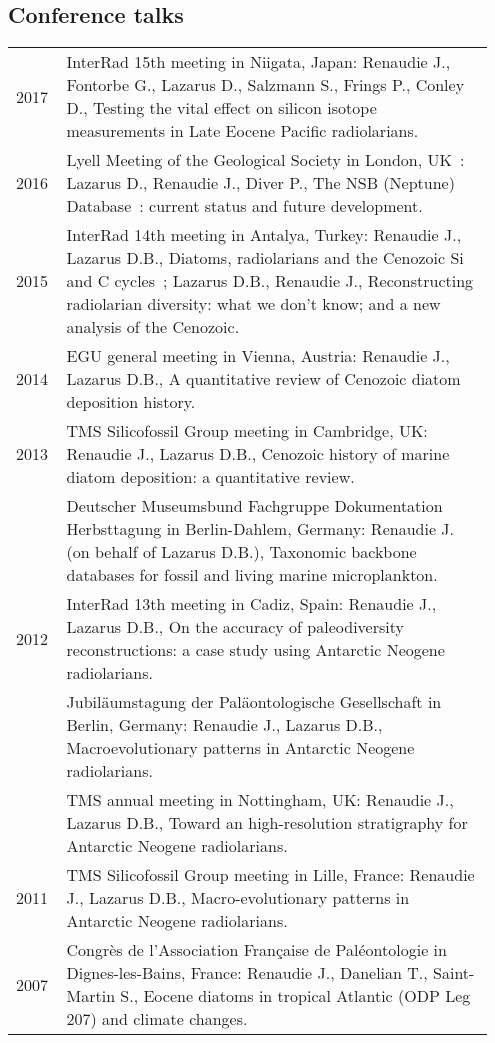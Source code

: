 \documentclass[11pt, a4paper]{article}
\begin{document}
\subsection{Conference talks}
\begin{longtable}{p{0.1\linewidth} P{0.85\linewidth}}
2017 & InterRad 15th meeting in Niigata, Japan: Renaudie J., Fontorbe G., Lazarus D., Salzmann S., Frings P., Conley D., Testing the vital effect on silicon isotope measurements in Late Eocene Pacific radiolarians.\\
2016 & Lyell Meeting of the Geological Society in London, UK : Lazarus D., Renaudie J., Diver P., The NSB (Neptune) Database : current status and future development.\\
2015 & InterRad 14th meeting in Antalya, Turkey: Renaudie J., Lazarus D.B., Diatoms, radiolarians and the Cenozoic Si and C cycles ; Lazarus D.B., Renaudie J., Reconstructing radiolarian diversity: what we don't know; and a new analysis of the Cenozoic.\\
2014 & EGU general meeting in Vienna, Austria: Renaudie J., Lazarus D.B., A quantitative review of Cenozoic diatom deposition history.\\
2013 & TMS Silicofossil Group meeting in Cambridge, UK: Renaudie J., Lazarus D.B., Cenozoic history of marine diatom deposition: a quantitative review.\\
 & Deutscher Museumsbund Fachgruppe Dokumentation Herbsttagung in Berlin-Dahlem, Germany: Renaudie J. (on behalf of Lazarus D.B.), Taxonomic backbone databases for fossil and living marine microplankton.\\
2012 & InterRad 13th meeting in Cadiz, Spain: Renaudie J., Lazarus D.B., On the accuracy of paleodiversity reconstructions: a case study using Antarctic Neogene radiolarians.\\
 & Jubil\"{a}umstagung der Pal\"{a}ontologische Gesellschaft in Berlin, Germany: Renaudie J., Lazarus D.B., Macroevolutionary patterns in Antarctic Neogene radiolarians.\\
 & TMS annual meeting in Nottingham, UK: Renaudie J., Lazarus D.B., Toward an high-resolution stratigraphy for Antarctic Neogene radiolarians.\\
2011 & TMS Silicofossil Group meeting in Lille, France: Renaudie J., Lazarus D.B., Macro-evolutionary patterns in Antarctic Neogene radiolarians.\\
2007 & Congr\`{e}s de l'Association Fran\c{c}aise de Pal\'{e}ontologie in Dignes-les-Bains, France: Renaudie J., Danelian T., Saint-Martin S., Eocene diatoms in tropical Atlantic (ODP Leg 207) and climate changes.\\
\end{longtable}
\end{document}
